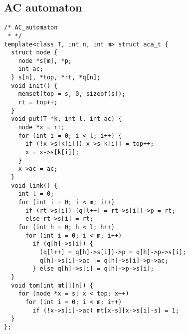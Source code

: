 \subsection{AC automaton}
\begin{lstlisting}
/* AC_automaton
 * */
template<class T, int n, int m> struct aca_t {
  struct node {
    node *s[m], *p;
    int ac;
  } s[n], *top, *rt, *q[n];
  void init() {
    memset(top = s, 0, sizeof(s));
    rt = top++;
  }
  void put(T *k, int l, int ac) {
    node *x = rt;
    for (int i = 0; i < l; i++) {
      if (!x->s[k[i]]) x->s[k[i]] = top++;
      x = x->s[k[i]];
    }
    x->ac = ac;
  }
  void link() {
    int l = 0;
    for (int i = 0; i < m; i++)
      if (rt->s[i]) (q[l++] = rt->s[i])->p = rt;
      else rt->s[i] = rt;
    for (int h = 0; h < l; h++)
      for (int i = 0; i < m; i++)
        if (q[h]->s[i]) {
          (q[l++] = q[h]->s[i])->p = q[h]->p->s[i];
          q[h]->s[i]->ac |= q[h]->s[i]->p->ac;
        } else q[h]->s[i] = q[h]->p->s[i];
  }
  void tom(int mt[][n]) {
    for (node *x = s; x < top; x++)
      for (int i = 0; i < m; i++)
        if (!x->s[i]->ac) mt[x-s][x->s[i]-s] = 1;
  }
};
\end{lstlisting}


